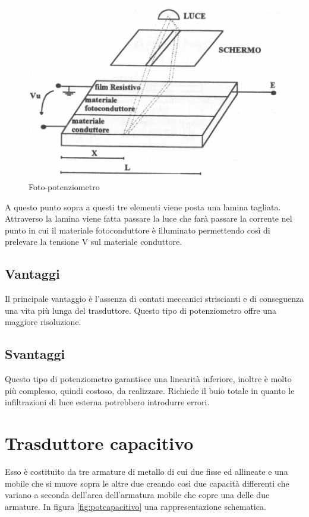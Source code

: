 \begin{figure}[htbp]
	\centering
	\includegraphics[scale=0.5]
			{img/fotopotenziometro.png}
	\caption{Foto-potenziometro\label{fig:fotopotenziometro}}
\end{figure}

A questo punto sopra a questi tre elementi viene posta una lamina
tagliata. Attraverso la lamina viene fatta passare la luce che farà
passare la corrente nel punto in cui il materiale fotoconduttore è
illuminato permettendo così di prelevare la tensione V sul materiale
conduttore.

\subsection{Vantaggi}
Il principale vantaggio è l'assenza di contati meccanici striscianti
e di conseguenza una vita più lunga del trasduttore. Questo tipo di
potenziometro offre una maggiore risoluzione.
\subsection{Svantaggi}
Questo tipo di potenziometro garantisce una linearità inferiore,
inoltre è molto più complesso, quindi costoso, da realizzare.
Richiede il buio totale in quanto le infiltrazioni di luce esterna
potrebbero introdurre errori.

\section{Trasduttore capacitivo}\label{sec:potcapacitivo}
Esso è costituito da tre armature di metallo di cui due fisse ed
allineate e una mobile che si muove sopra le altre due creando così
due capacità differenti che variano a seconda dell'area dell'armatura
mobile che copre una delle due armature. In figura
\ref{fig:potcapacitivo} una rappresentazione schematica.

